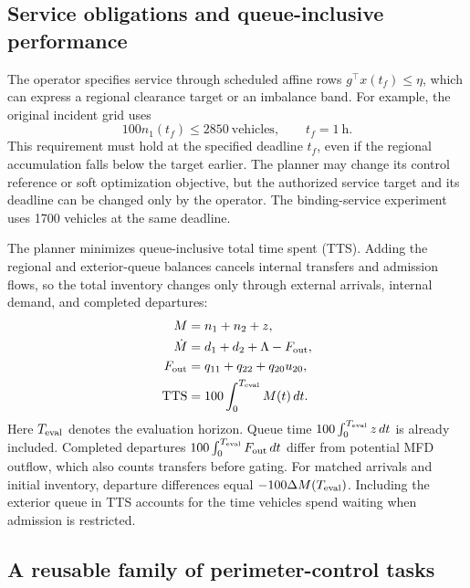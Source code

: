 \documentclass[journal,10pt]{IEEEtran}
\begin{document}
\subsection{Service obligations and queue-inclusive performance}

The operator specifies service through scheduled affine rows
$g^\top x(t_f)\le\eta$, which can express a regional clearance target or an
imbalance band. For example, the original incident grid uses
\begin{equation}
100n_1(t_f)\le2850\ \text{vehicles},\qquad t_f=1\ \text{h}.
\label{eq:new-service}
\end{equation}
This requirement must hold at the specified deadline \(t_f\), even if the regional accumulation falls below the target earlier. The planner may change its control reference or soft optimization objective, but the authorized service target and its deadline can be changed only by the operator. The binding-service experiment uses 1700 vehicles
at the same deadline.

The planner minimizes queue-inclusive total time spent (TTS). Adding the regional and exterior-queue balances cancels internal transfers and admission flows, so the total inventory changes only through external arrivals, internal demand, and completed departures:
\begin{equation}
\begin{aligned}
M&=n_1+n_2+z,\\
\dot M&=d_1+d_2+\Lambda-F_{\rm out},\\
F_{\rm out}&=q_{11}+q_{22}+q_{20}u_{20},\\
\mathrm{TTS}&=100\int_0^{T_{\rm eval}} M(t)\,dt.
\end{aligned}
\label{eq:new-conservation}
\end{equation}
Here $T_{\rm eval}$ denotes the evaluation horizon. Queue time
$100\int_0^{T_{\rm eval}} z\,dt$ is already included. Completed departures
$100\int_0^{T_{\rm eval}} F_{\rm out}\,dt$ differ from potential MFD outflow,
which also counts transfers before gating. For matched arrivals and initial
inventory, departure differences equal
$-100\Delta M(T_{\rm eval})$. Including the exterior queue in TTS accounts for the time vehicles spend
waiting when admission is restricted.

\subsection{A reusable family of perimeter-control tasks}
\label{sec:benchmark-formulation}
\end{document}
